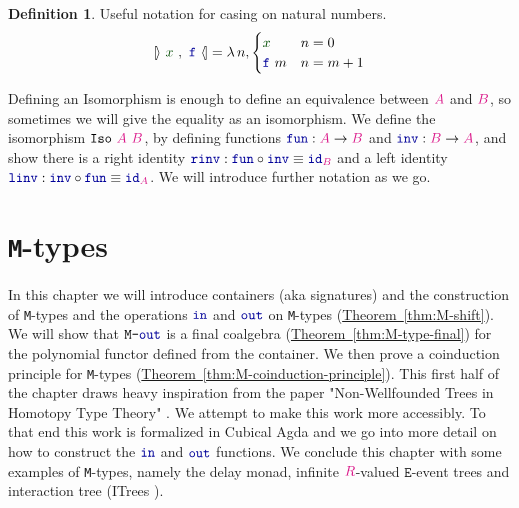 \documentclass[twoside,11pt,openright]{report}
\theoremstyle{plain} %
\theoremstyle{definition}
\newtheorem{defn}[thm]{Definition}%
\theoremstyle{remark}
\newcommand*{\thmref}[1]{\hyperref[thm:#1]{Theorem~\ref*{thm:#1}}} %
\newcommand*{\term}[1]{\textcolor{green!30!black}{#1}} %
\newcommand*{\type}[1]{\textcolor{magenta!90!black}{#1}}
\newcommand*{\coalg}[2]{#1\texttt{-}#2}
\newcommand*{\function}[1]{\textcolor{blue!60!black}{\ensuremath{\mathtt{#1}}}}
\newcommand*{\typeformer}[1]{\ensuremath{\mathtt{#1}}}
\newcommand*{\natcases}[2]{\ensuremath{\mathbb{[\hspace{-.5mm}\rangle}~\ensuremath{#1}~,~\ensuremath{#2}~\mathbb{\langle\hspace{-.5mm}]}}}
\begin{document}
\begin{defn}
  Useful notation for casing on natural numbers.
  \begin{equation}
    \natcases{\term{x}}{\function{f}} = \lambda\,n, \begin{cases} \term{x} & n = 0 \\ \function{f}~m & n = m + 1 \end{cases}
  \end{equation}
\end{defn}
\noindent Defining an Isomorphism is enough to define an equivalence between \(\type{A}\) and \(\type{B}\), so sometimes we will give the equality as an isomorphism. We define the isomorphism \(\mathtt{Iso}~\type{A}~\type{B}\), by defining functions \(\function{fun} : \type{A} \rightarrow \type{B}\) and \(\function{inv} : \type{B} \rightarrow \type{A}\), and show there is a right identity \(\function{rinv} : \function{fun} \circ \function{inv} \equiv \function{id}_{\type{B}}\) and a left identity \(\function{linv} : \function{inv} \circ \function{fun} \equiv \function{id}_{\type{A}}\).  We will introduce further notation as we go.


\chapter{\texttt{M}-types}
\label{ch:M-types}
In this chapter we will introduce containers (aka signatures) and the construction of \texttt{M}-types and the operations \(\function{in}\) and \(\function{out}\) on \texttt{M}-types (\thmref{M-shift}). We will show that \(\coalg{\typeformer{M}}{\function{out}}\) is a final coalgebra (\thmref{M-type-final}) for the polynomial functor defined from the container. We then prove a coinduction principle for \texttt{M}-types (\thmref{M-coinduction-principle}). This first half of the chapter draws heavy inspiration from the paper "Non-Wellfounded Trees in Homotopy Type Theory" \cite{DBLP:non-wellfounded}. We attempt to make this work more accessibly. To that end this work is formalized in Cubical Agda and we go into more detail on how to construct the \(\function{in}\) and \(\function{out}\) functions. We conclude this chapter with some examples of \texttt{M}-types, namely the delay monad, infinite \(\type{R}\)-valued \(\typeformer{E}\)-event trees and interaction tree (ITrees \cite{DBLP:itrees}).
\end{document}
